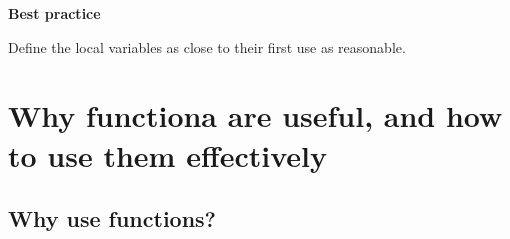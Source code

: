 \documentclass[
  letterpaper,
  DIV=11,
  numbers=noendperiod]{scrreprt}
\begin{document}
\begin{tcolorbox}[enhanced jigsaw, toprule=.15mm, rightrule=.15mm, opacityback=0, breakable, leftrule=.75mm, colback=white, colframe=quarto-callout-tip-color-frame, arc=.35mm, left=2mm, bottomrule=.15mm]
\begin{minipage}[t]{5.5mm}
\textcolor{quarto-callout-tip-color}{\faLightbulb}
\end{minipage}%
\begin{minipage}[t]{\textwidth - 5.5mm}

\textbf{Best practice}\vspace{2mm}

Define the local variables as close to their first use as reasonable.

\end{minipage}%
\end{tcolorbox}

\hypertarget{why-functiona-are-useful-and-how-to-use-them-effectively}{%
\section{Why functiona are useful, and how to use them
effectively}\label{why-functiona-are-useful-and-how-to-use-them-effectively}}

\hypertarget{why-use-functions}{%
\subsection{Why use functions?}\label{why-use-functions}}
\end{document}
